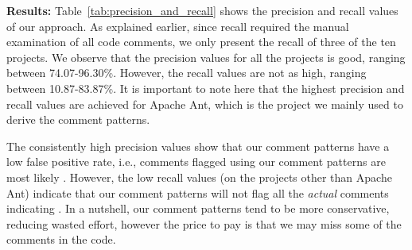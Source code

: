 

\noindent \textbf{Results:} Table~\ref{tab:precision_and_recall} shows the precision and recall values of our approach. As explained earlier, since recall required the manual examination of all code comments, we only present the recall of three of the ten projects. We observe that the precision values for all the projects is good, ranging between 74.07-96.30\%. However, the recall values are not as high, ranging between 10.87-83.87\%. It is important to note here that the highest precision and recall values are achieved for Apache Ant, which is the project we mainly used to derive the comment patterns.

The consistently high precision values show that our comment patterns have a low false positive rate, i.e., comments flagged using our comment patterns are most likely \SADTD. However, the low recall values (on the projects other than Apache Ant) indicate that our comment patterns will not flag all the \emph{actual} comments indicating \SADTD. In a nutshell, our comment patterns tend to be more conservative, reducing wasted effort, however the price to pay is that we may miss some of the \SADTD comments in the code. 

